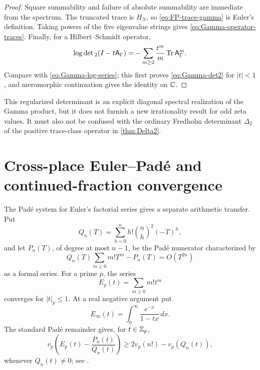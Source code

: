 \begin{proof}
Square summability and failure of absolute summability are immediate from
the spectrum.  The truncated trace is \(H_N\), so
\eqref{eq:FP-trace-gamma} is Euler's definition.  Taking powers of the five
eigenvalue strings gives \eqref{eq:Gamma-operator-traces}.  Finally, for a
Hilbert--Schmidt operator,
\[
 \log\det{}_2(I-t\mathsf A_\Gamma)
 =-\sum_{m\ge2}\frac{t^m}{m}\operatorname{Tr}\mathsf A_\Gamma^m.
\]
Compare with \eqref{eq:Gamma-log-series}; this first proves
\eqref{eq:Gamma-det2} for \(|t|<1\), and meromorphic continuation gives the
identity on \(\mathbb C\).
\end{proof}

This regularized determinant is an explicit diagonal spectral realization of the
Gamma product, but it does not furnish a new irrationality result for odd
zeta values.  It must also not be confused with the ordinary Fredholm
determinant \(\Delta_2\) of the positive trace-class operator in
\cref{thm:Delta2}.

\section{Cross-place Euler--Pad\'e and continued-fraction convergence}
\label{sec:cross-place-pade}

The Pad\'e system for Euler's factorial series gives a separate arithmetic
transfer.  Put
\begin{equation}\label{eq:Euler-Pade-Q}
 Q_n(T)=\sum_{h=0}^nh!\binom nh^2(-T)^h,
\end{equation}
and let \(P_n(T)\), of degree at most \(n-1\), be the Pad\'e numerator
characterized by
\begin{equation}\label{eq:Euler-Pade-condition}
 Q_n(T)\sum_{m\ge0}m!T^m-P_n(T)=O(T^{2n})
\end{equation}
as a formal series.  For a prime \(p\), the series
\begin{equation}\label{eq:p-adic-Euler-series}
 E_p(t)=\sum_{m\ge0}m!t^m
\end{equation}
converges for \(|t|_p\le1\).  At a real negative argument put
\begin{equation}\label{eq:real-Euler-function}
 E_\infty(t)=\int_0^\infty\frac{e^{-x}}{1-tx}\,dx.
\end{equation}
The standard Pad\'e remainder gives, for \(t\in\mathbb Z_p\),
\begin{equation}\label{eq:p-adic-remainder-bound}
 v_p\!\left(E_p(t)-\frac{P_n(t)}{Q_n(t)}\right)
 \ge2v_p(n!)-v_p(Q_n(t)),
\end{equation}
whenever \(Q_n(t)\ne0\); see
\cite{ErnvallMatalaSeppala2022}.


